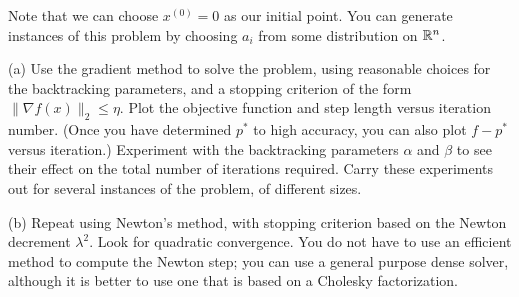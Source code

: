\documentclass[11pt]{article}
\newcommand{\grad}{\nabla}
\begin{document}
Note that we can choose $x^{(0)} = 0$ as our initial point. You can generate instances of this problem by choosing $a_i$ from some distribution on ${{\mathbb{R}}}^n$.

(a) Use the gradient method to solve the problem, using reasonable choices for the backtracking parameters, and a stopping criterion of the form $\|\grad f(x) \|_2 \leq \eta$. Plot the objective function and step length versus iteration number. (Once you have determined $p^*$ to high accuracy, you can also plot $f - p^*$ versus iteration.) Experiment with the backtracking parameters $\alpha$ and $\beta$ to see their effect on the total number of iterations required. Carry these experiments out for several instances of the problem, of different sizes.

(b) Repeat using Newton's method, with stopping criterion based on the Newton decrement $\lambda^2$. Look for quadratic convergence. You do not have to use an efficient method to compute the Newton step; you can use a general purpose dense solver, although it is better to use one that is based on a Cholesky factorization.
\end{document}
